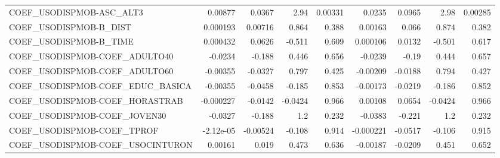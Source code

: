 \begin{tabular}{lrrrrrrrr}
COEF\_USODISPMOB-ASC\_ALT3          &     0.00877 &       0.0367 &    2.94 &  0.00331 &     0.0235 &      0.0965 &         2.98 &       0.00285 \\
COEF\_USODISPMOB-B\_DIST            &    0.000193 &      0.00716 &   0.864 &    0.388 &    0.00163 &       0.066 &        0.874 &         0.382 \\
COEF\_USODISPMOB-B\_TIME            &    0.000432 &       0.0626 &  -0.511 &    0.609 &   0.000106 &      0.0132 &       -0.501 &         0.617 \\
COEF\_USODISPMOB-COEF\_ADULTO40     &     -0.0234 &       -0.188 &   0.446 &    0.656 &    -0.0239 &       -0.19 &        0.444 &         0.657 \\
COEF\_USODISPMOB-COEF\_ADULTO60     &    -0.00355 &      -0.0327 &   0.797 &    0.425 &   -0.00209 &     -0.0188 &        0.794 &         0.427 \\
COEF\_USODISPMOB-COEF\_EDUC\_BASICA  &    -0.00355 &      -0.0458 &  -0.185 &    0.853 &   -0.00173 &     -0.0219 &       -0.186 &         0.852 \\
COEF\_USODISPMOB-COEF\_HORASTRAB    &   -0.000227 &      -0.0142 & -0.0424 &    0.966 &    0.00108 &      0.0654 &      -0.0424 &         0.966 \\
COEF\_USODISPMOB-COEF\_JOVEN30      &     -0.0327 &       -0.188 &     1.2 &    0.232 &    -0.0383 &      -0.221 &          1.2 &         0.232 \\
COEF\_USODISPMOB-COEF\_TPROF        &   -2.12e-05 &     -0.00524 &  -0.108 &    0.914 &  -0.000221 &     -0.0517 &       -0.106 &         0.915 \\
COEF\_USODISPMOB-COEF\_USOCINTURON  &     0.00161 &        0.019 &   0.473 &    0.636 &   -0.00187 &     -0.0209 &        0.451 &         0.652 \\
\bottomrule
\end{tabular}
